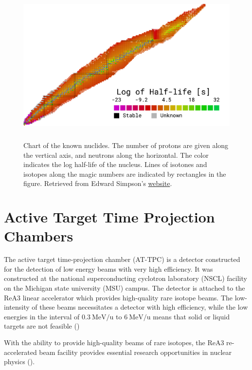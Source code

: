 \begin{figure}
\centering
\includegraphics[width=\textwidth, height=8cm]{../plots/chart}
\caption[Chart of the nuclides]{Chart of the known nuclides. The number of protons are given along the vertical axis, and neutrons along the horizontal. The color indicates the log half-life of the nucleus. Lines of isotones and isotopes along the magic numbers are indicated by rectangles in the figure. Retrieved from Edward Simpson's \href{https://people.physics.anu.edu.au/~ecs103/chart/}{website}.}
\end{figure}

\section{Active Target Time Projection Chambers}\label{sec:attpc}

The active target time-projection chamber (AT-TPC) is a detector constructed for the detection of low energy beams with very high efficiency. It was constructed at the national superconducting cyclotron laboratory (NSCL) facility on the Michigan state university (MSU) campus. The detector is attached to the ReA3 linear accelerator which provides high-quality rare isotope beams. The low-intensity of these beams necessitates a detector with high efficiency, while the low energies in the interval of $\SI[per-mode=symbol]{0.3}{\MeV \per \atomicmassunit}$ to $\SI[per-mode=symbol]{6}{\MeV \per \atomicmassunit}$ means that solid or liquid targets are not feasible (\cite{Bradt2017a})

 With the ability to provide high-quality beams of rare isotopes, the ReA3 re-accelerated beam facility provides essential research opportunities in nuclear physics (\cite{Kester2010}). 

